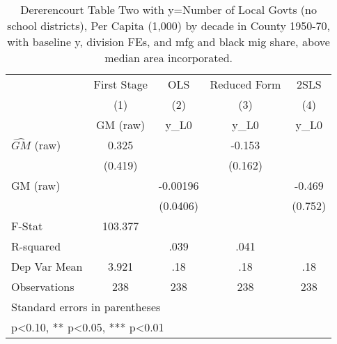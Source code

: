 \begin{table}[htbp]\centering
\def\sym#1{\ifmmode^{#1}\else\(^{#1}\)\fi}
\caption{Dererencourt Table Two with y=Number of Local Govts (no school districts), Per Capita (1,000) by decade in County 1950-70, with baseline y, division FEs, and mfg and black mig share, above median area incorporated.}
\begin{tabular}{l*{4}{c}}
\toprule
                    & First Stage   &         OLS   &Reduced Form   &        2SLS   \\
                    &\multicolumn{1}{c}{(1)}&\multicolumn{1}{c}{(2)}&\multicolumn{1}{c}{(3)}&\multicolumn{1}{c}{(4)}\\
                    &\multicolumn{1}{c}{GM  (raw)}&\multicolumn{1}{c}{y\_L0}&\multicolumn{1}{c}{y\_L0}&\multicolumn{1}{c}{y\_L0}\\
\midrule
$\hat{GM}$ (raw)    &       0.325   &               &      -0.153   &               \\
                    &     (0.419)   &               &     (0.162)   &               \\
\addlinespace
GM  (raw)           &               &    -0.00196   &               &      -0.469   \\
                    &               &    (0.0406)   &               &     (0.752)   \\
\midrule
F-Stat              &     103.377   &               &               &               \\
R-squared           &               &        .039   &        .041   &               \\
Dep Var Mean        &       3.921   &         .18   &         .18   &         .18   \\
Observations        &         238   &         238   &         238   &         238   \\
\bottomrule
\multicolumn{5}{l}{\footnotesize Standard errors in parentheses}\\
\multicolumn{5}{l}{\footnotesize * p<0.10, ** p<0.05, *** p<0.01}\\
\end{tabular}
\end{table}

